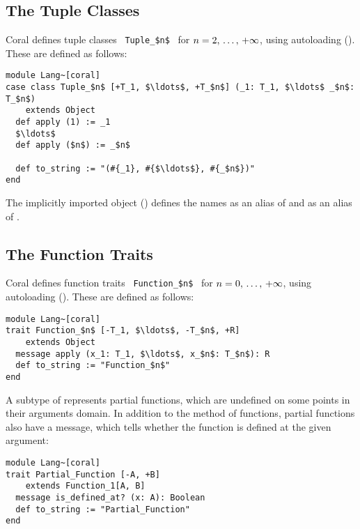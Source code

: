 \subsection{The Tuple Classes}

Coral defines tuple classes ~\lstinline!Tuple_$n$!~ for $n = 2 ,\, \ldots ,\, +\infty$, using autoloading (). These are defined as follows:

\begin{lstlisting}
module Lang~[coral]
case class Tuple_$n$ [+T_1, $\ldots$, +T_$n$] (_1: T_1, $\ldots$ _$n$: T_$n$)
    extends Object
  def apply (1) := _1
  $\ldots$
  def apply ($n$) := _$n$
  
  def to_string := "(#{_1}, #{$\ldots$}, #{_$n$})"
end
\end{lstlisting}

The implicitly imported  object () defines the names  as an alias of  and  as an alias of . 






\subsection{The Function Traits}

Coral defines function traits ~\lstinline!Function_$n$!~ for $n = 0 ,\, \ldots ,\, +\infty$, using autoloading (). These are defined as follows: 

\begin{lstlisting}
module Lang~[coral]
trait Function_$n$ [-T_1, $\ldots$, -T_$n$, +R]
    extends Object
  message apply (x_1: T_1, $\ldots$, x_$n$: T_$n$): R
  def to_string := "Function_$n$"
end
\end{lstlisting}

A subtype of  represents partial functions, which are undefined on some points in their arguments domain. In addition to the  method of functions, partial functions also have a  message, which tells whether the function is defined at the given argument:

\begin{lstlisting}
module Lang~[coral]
trait Partial_Function [-A, +B]
    extends Function_1[A, B]
  message is_defined_at? (x: A): Boolean
  def to_string := "Partial_Function"
end
\end{lstlisting}





